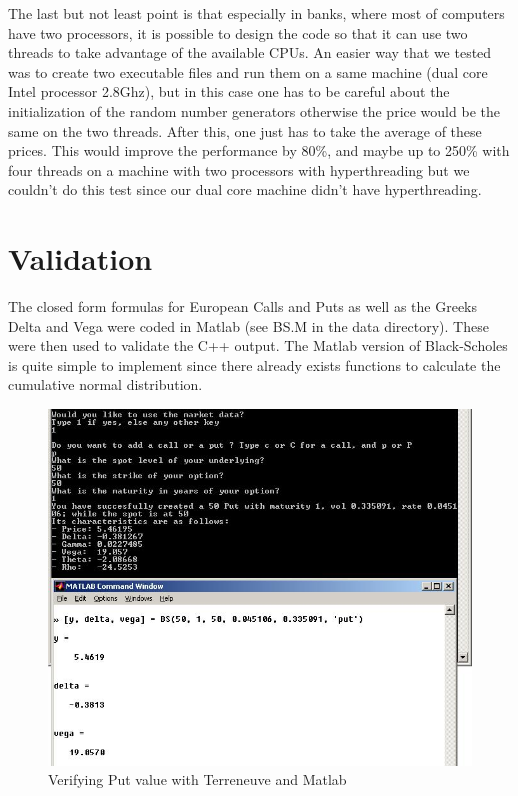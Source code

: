 The last but not least point is that especially in banks, where most
of computers have two processors, it is possible to design the code
so that it can use two threads to take advantage of the available
CPUs.  An easier way that we tested was to create two executable
files and run them on a same machine (dual core Intel processor
2.8Ghz), but in this case one has to be careful about the
initialization of the random number generators otherwise the price
would be the same on the two threads. After this, one just has to
take the average of these prices. This would improve the performance
by 80\%, and maybe up to 250\% with four threads on a machine with
two processors with hyperthreading but we couldn't do this test
since our dual core machine didn't have hyperthreading.


\section{Validation}

The closed form formulas for European Calls and Puts as well as the
Greeks Delta and Vega were coded in Matlab (see BS.M in the data
directory).  These were then used to validate the C++ output.  The
Matlab version of Black-Scholes is quite simple to implement since
there already exists functions to calculate the cumulative normal
distribution.

\begin{figure}[htbp]
\begin{center}
        \includegraphics[width=12cm]{blackscholes-matlab.jpg}
        \caption{Verifying Put value with Terreneuve and Matlab}
\end{center}
\end{figure}

